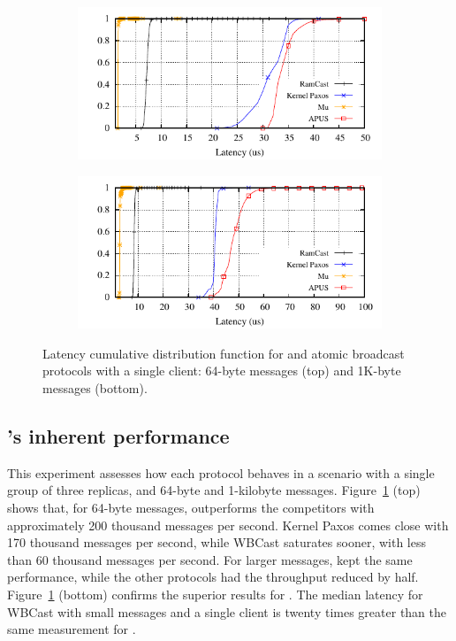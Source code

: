 \begin{figure}[htp!]
  \begin{subfigure}{\columnwidth}
    \advance\leftskip-0.0cm
    \includegraphics[width=1\columnwidth]{figures/benchmark/graphs/figure-compare-single-group-latency-cdf-64b}
  \end{subfigure}
  \begin{subfigure}{\columnwidth}
    \centering
    \includegraphics[width=1\columnwidth]{figures/benchmark/graphs/figure-compare-single-group-latency-cdf-1k}
  \end{subfigure}
  \caption{Latency cumulative distribution function for \libname and atomic broadcast protocols with a single client: 64-byte messages (top) and 1K-byte messages (bottom).}
  \label{fig:broadcast}
\end{figure}



\subsection{\libname's inherent performance}
\label{sec:evaluation:broadcast}

This experiment assesses how each protocol behaves in a scenario with a single group of three replicas, and 64-byte and 1-kilobyte messages.
Figure~\ref{fig:broadcast} (top) shows that, for 64-byte messages, \libname outperforms the competitors with approximately 200 thousand messages per second. 
Kernel Paxos comes close with 170 thousand messages per second, while WBCast saturates sooner, with less than 60 thousand messages per second.
For larger messages, \libname kept the same performance, while the other protocols had the throughput reduced by half.
Figure~\ref{fig:broadcast} (bottom) confirms the superior results for \libname. The median latency for WBCast with small messages and a single client is twenty times greater than the same measurement for \libname.


